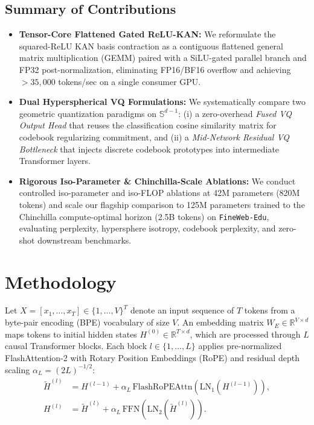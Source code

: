 \documentclass[11pt,a4paper]{article}
\newcommand{\R}{\mathbb{R}}
\newcommand{\Sphere}{\mathbb{S}^{d-1}}
\begin{document}
\subsection{Summary of Contributions}
\begin{itemize}
    \item \textbf{Tensor-Core Flattened Gated ReLU-KAN:} We reformulate the squared-ReLU KAN basis contraction as a contiguous flattened general matrix multiplication (GEMM) paired with a SiLU-gated parallel branch and FP32 post-normalization, eliminating FP16/BF16 overflow and achieving $>35,000$ tokens/sec on a single consumer GPU.
    \item \textbf{Dual Hyperspherical VQ Formulations:} We systematically compare two geometric quantization paradigms on $\Sphere$: (i) a zero-overhead \emph{Fused VQ Output Head} that reuses the classification cosine similarity matrix for codebook regularizing commitment, and (ii) a \emph{Mid-Network Residual VQ Bottleneck} that injects discrete codebook prototypes into intermediate Transformer layers.
    \item \textbf{Rigorous Iso-Parameter \& Chinchilla-Scale Ablations:} We conduct controlled iso-parameter and iso-FLOP ablations at 42M parameters (820M tokens) and scale our flagship comparison to 125M parameters trained to the Chinchilla compute-optimal horizon (2.5B tokens) on \texttt{FineWeb-Edu}, evaluating perplexity, hypersphere isotropy, codebook perplexity, and zero-shot downstream benchmarks.
\end{itemize}

\section{Methodology}

Let $X = [x_1, \dots, x_T] \in \{1, \dots, V\}^T$ denote an input sequence of $T$ tokens from a byte-pair encoding (BPE) vocabulary of size $V$. An embedding matrix $W_E \in \R^{V \times d}$ maps tokens to initial hidden states $H^{(0)} \in \R^{T \times d}$, which are processed through $L$ causal Transformer blocks. Each block $l \in \{1, \dots, L\}$ applies pre-normalized FlashAttention-2 with Rotary Position Embeddings (RoPE) \cite{su2024roformer} and residual depth scaling $\alpha_L = (2L)^{-1/2}$:
\begin{align}
    \tilde{H}^{(l)} &= H^{(l-1)} + \alpha_L \, \text{FlashRoPEAttn}\!\left(\text{LN}_1(H^{(l-1)})\right), \\
    H^{(l)} &= \tilde{H}^{(l)} + \alpha_L \, \text{FFN}\!\left(\text{LN}_2(\tilde{H}^{(l)})\right).
\end{align}
\end{document}
